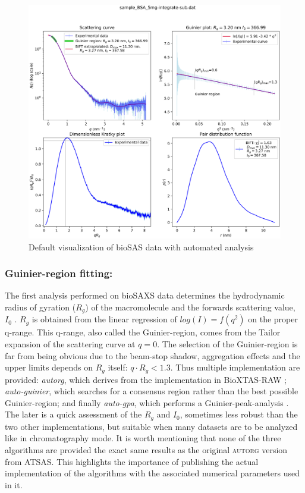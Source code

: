 \documentclass[preprint]{iucr}              %
\begin{document}
\begin{figure}
\label{plot}
\begin{center}
\includegraphics[width=12cm]{Figure_1.eps}
\caption{Default visualization of bioSAS data with automated analysis}
\end{center}
\end{figure}


\subsubsection{Guinier-region fitting:}
The first analysis performed on bioSAXS data determines the hydrodynamic radius of gyration ($R_g$) of the macromolecule and the forwards scattering value, $I_0$ \cite{guinier}.
$R_g$ is obtained from the linear regression of $log(I) = f(q^2)$ on the proper q-range. 
This q-range, also called the Guinier-region, comes from the Tailor expansion of the scattering curve at $q=0$.
The selection of the Guinier-region is far from being obvious due to the beam-stop shadow, aggregation effects and the upper limits depends on $R_g$ itself: $q \cdot R_g<1.3$.
Thus multiple implementation are provided: \textit{autorg}, which derives from the implementation in BioXTAS-RAW \cite{bioxtasraw}; \textit{auto-guinier}, which searches for a consensus region rather than the best possible Guinier-region; and finally \textit{auto-gpa}, which performs a Guinier-peak-analysis \cite{gpa}. 
The later is a quick assessment of the $R_g$ and $I_0$, sometimes less robust than the two other implementations, but suitable when many datasets are to be analyzed like in chromatography mode.
It is worth mentioning that none of the three algorithms are provided the exact same results as the original \textsc{autorg} \cite{ATSAS2} version from ATSAS. 
This highlights the importance of publishing the actual implementation of the algorithms with the associated numerical parameters used in it.
  
\end{document}
